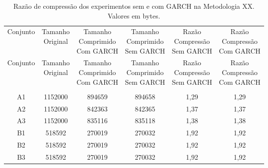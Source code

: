 \begin{center}
\begin{longtable}{cccccc}
\toprule
\rowcolor{white}
\caption[Metodologia XX: Razão de compressão]{Razão de compressão dos
experimentos sem e com GARCH na Metodologia XX.
Valores em bytes.} \label{Tab:razaocompressaoMet} \\
\midrule
Conjunto & \specialcell{Tamanho \\Original} & \specialcell{Tamanho
\\Comprimido\\Com GARCH} & \specialcell{Tamanho
\\Comprimido\\Sem GARCH} & \specialcell{Razão \\Compressão
\\Sem GARCH} & \specialcell{Razão \\Compressão
\\Com GARCH} \\
\midrule
\endfirsthead
\midrule
\rowcolor{white}
Conjunto & \specialcell{Tamanho \\Original} & \specialcell{Tamanho
\\Comprimido\\Com GARCH} & \specialcell{Tamanho
\\Comprimido\\Sem GARCH} & \specialcell{Razão \\Compressão
\\Sem GARCH} & \specialcell{Razão \\Compressão
\\Com GARCH} \\
\toprule
\endhead
\midrule \\ %
\endfoot
\bottomrule
\endlastfoot
A1    & 1152000 & 894659 & 894658 & 1,29  & 1,29 \\
A2    & 1152000 & 842363 & 842365 & 1,37  & 1,37 \\
A3    & 1152000 & 835116 & 835118 & 1,38  & 1,38 \\
B1    & 518592 & 270019 & 270032 & 1,92  & 1,92 \\
B2    & 518592 & 270019 & 270032 & 1,92  & 1,92 \\
B3    & 518592 & 270019 & 270032 & 1,92  & 1,92 \\

\end{longtable}
\end{center}
